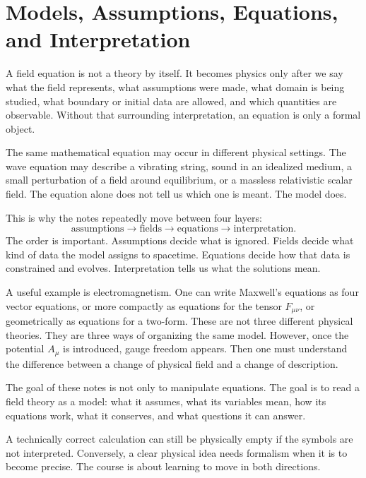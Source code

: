 \section{Models, Assumptions, Equations, and Interpretation}

A field equation is not a theory by itself. It becomes physics only after we say
what the field represents, what assumptions were made, what domain is being
studied, what boundary or initial data are allowed, and which quantities are
observable. Without that surrounding interpretation, an equation is only a
formal object.

The same mathematical equation may occur in different physical settings. The
wave equation may describe a vibrating string, sound in an idealized medium, a
small perturbation of a field around equilibrium, or a massless relativistic
scalar field. The equation alone does not tell us which one is meant. The model
does.

This is why the notes repeatedly move between four layers:
\[
    \text{assumptions}
    \longrightarrow
    \text{fields}
    \longrightarrow
    \text{equations}
    \longrightarrow
    \text{interpretation}.
\]
The order is important. Assumptions decide what is ignored. Fields decide what
kind of data the model assigns to spacetime. Equations decide how that data is
constrained and evolves. Interpretation tells us what the solutions mean.

A useful example is electromagnetism. One can write Maxwell's equations as four
vector equations, or more compactly as equations for the tensor \(F_{\mu\nu}\),
or geometrically as equations for a two-form. These are not three different
physical theories. They are three ways of organizing the same model. However,
once the potential \(A_\mu\) is introduced, gauge freedom appears. Then one must
understand the difference between a change of physical field and a change of
description.

\begin{summarybox}
The goal of these notes is not only to manipulate equations. The goal is to read
a field theory as a model: what it assumes, what its variables mean, how its
equations work, what it conserves, and what questions it can answer.
\end{summarybox}

A technically correct calculation can still be physically empty if the symbols
are not interpreted. Conversely, a clear physical idea needs formalism when it is
to become precise. The course is about learning to move in both directions.
